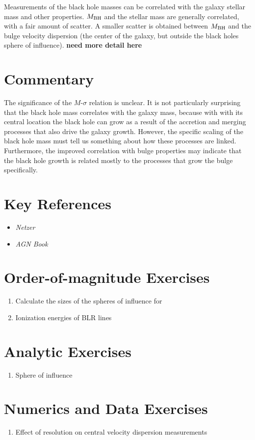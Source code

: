 Measurements of the black hole masses can be correlated with the
galaxy stellar mass and other properties. $M_{\rm BH}$ and the stellar
mass are generally correlated, with a fair amount of scatter. A
smaller scatter is obtained between $M_{\rm BH}$ and the bulge
velocity dispersion (the center of the galaxy, but outside the black
holes sphere of influence).  {\bf need more detail here}

\section{Commentary}

The significance of the $M$-$\sigma$ relation is unclear. It is not
particularly surprising that the black hole mass correlates with the
galaxy mass, because with with its central location the black hole can
grow as a result of the accretion and merging processes that also
drive the galaxy growth. However, the specific scaling of the black
hole mass must tell us something about how these processes are
linked. Furthermore, the improved correlation with bulge properties
may indicate that the black hole growth is related mostly to the
processes that grow the bulge specifically.

\section{Key References}

\begin{itemize}
  \item
    {\it Netzer}
  \item
    {\it AGN Book}
\end{itemize}

\citet{gunn06a}

\section{Order-of-magnitude Exercises}

\begin{enumerate} 
\item Calculate the sizes of the spheres of influence for 
\item Ionization energies of BLR lines
\end{enumerate} 

\section{Analytic Exercises}

\begin{enumerate}
\item Sphere of influence
\end{enumerate}

\section{Numerics and Data Exercises}

\begin{enumerate}
\item Effect of resolution on central velocity dispersion measurements
\end{enumerate}


  
